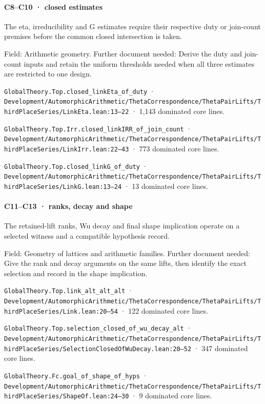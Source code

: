 \paragraph{C8–C10 · closed estimates}

The eta, irreducibility and G estimates require their respective duty or join-count premises before the common closed intersection is taken.

Field: Arithmetic geometry. Further document needed: Derive the duty and join-count inputs and retain the uniform thresholds needed when all three estimates are restricted to one design.

\nolinkurl{GlobalTheory.Top.closed_linkEta_of_duty} · \nolinkurl{Development/AutomorphicArithmetic/ThetaCorrespondence/ThetaPairLifts/ThirdPlaceSeries/LinkEta.lean:13–22} · 1,143 dominated core lines.

\nolinkurl{GlobalTheory.Top.Irr.closed_linkIRR_of_join_count} · \nolinkurl{Development/AutomorphicArithmetic/ThetaCorrespondence/ThetaPairLifts/ThirdPlaceSeries/LinkIrr.lean:22–43} · 773 dominated core lines.

\nolinkurl{GlobalTheory.Top.closed_linkG_of_duty} · \nolinkurl{Development/AutomorphicArithmetic/ThetaCorrespondence/ThetaPairLifts/ThirdPlaceSeries/LinkG.lean:13–24} · 13 dominated core lines.

\paragraph{C11–C13 · ranks, decay and shape}

The retained-lift ranks, Wu decay and final shape implication operate on a selected witness and a compatible hypothesis record.

Field: Geometry of lattices and arithmetic families. Further document needed: Give the rank and decay arguments on the same lifts, then identify the exact selection and record in the shape implication.

\nolinkurl{GlobalTheory.Top.link_alt_alt_alt} · \nolinkurl{Development/AutomorphicArithmetic/ThetaCorrespondence/ThetaPairLifts/ThirdPlaceSeries/Link.lean:20–54} · 122 dominated core lines.

\nolinkurl{GlobalTheory.Top.selection_closed_of_wu_decay_alt} · \nolinkurl{Development/AutomorphicArithmetic/ThetaCorrespondence/ThetaPairLifts/ThirdPlaceSeries/SelectionClosedOfWuDecay.lean:20–52} · 347 dominated core lines.

\nolinkurl{GlobalTheory.Fc.goal_of_shape_of_hyps} · \nolinkurl{Development/AutomorphicArithmetic/ThetaCorrespondence/ThetaPairLifts/ThirdPlaceSeries/ShapeOf.lean:24–30} · 9 dominated core lines.

